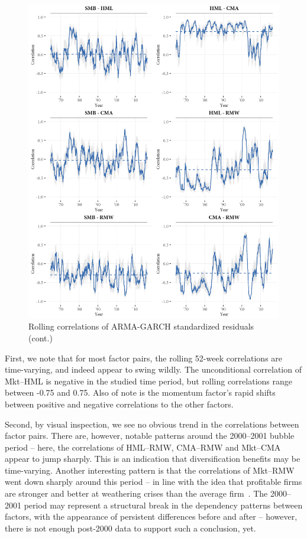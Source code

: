\begin{figure}[!ht]
  \ContinuedFloat
  \centering
  \includegraphics[scale=1]{graphics/rolling2.png}  
  \footnotesize
  \caption{Rolling correlations of ARMA-GARCH standardized residuals (cont.)}
\end{figure}
First, we note that for most factor pairs, the rolling 52-week correlations are time-varying, and indeed appear to swing wildly. The unconditional correlation of Mkt--HML is negative in the studied time period, but rolling correlations range between -0.75 and 0.75. Also of note is the momentum factor's rapid shifts between positive and negative correlations to the other factors. 

Second, by visual inspection, we see no obvious trend in the correlations between factor pairs. There are, however, notable patterns around the 2000--2001 bubble period -- here, the correlations of HML--RMW, CMA--RMW and Mkt--CMA appear to jump sharply. This is an indication that diversification benefits may be time-varying. Another interesting pattern is that the correlations of Mkt--RMW went down sharply around this period -- in line with the idea that profitable firms are stronger and better at weathering crises than the average firm~\autocite{NovyMarx2013}. The 2000--2001 period may represent a structural break in the dependency patterns between factors, with the appearance of persistent differences before and after -- however, there is not enough post-2000 data to support such a conclusion, yet.

